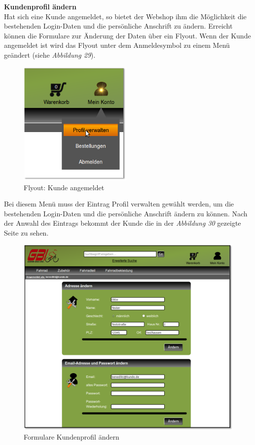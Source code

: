 \textbf{Kundenprofil ändern}\\
Hat sich eine Kunde angemeldet, so bietet der Webshop ihm die Möglichkeit die bestehenden Login-Daten und die persönliche Anschrift zu ändern. Erreicht können die Formulare zur Änderung der Daten über ein Flyout. Wenn der Kunde angemeldet ist wird das Flyout unter dem Anmeldesymbol zu einem Menü geändert (siehe \textit{Abbildung 29}).
\begin{figure}[H]
	\begin{center}
			\includegraphics[width=55mm]{Bilder/Abbildung15_Menue_Profil_aendern.png}
	\end{center}
	\caption{Flyout: Kunde angemeldet}
\end{figure}
Bei diesem Menü muss der Eintrag \glqq Profil verwalten\grqq{} gewählt werden, um die bestehenden Login-Daten und die persönliche Anschrift ändern zu können. Nach der Anwahl des Eintrags bekommt der Kunde die in der \textit{Abbildung 30} gezeigte Seite zu sehen.
\begin{figure}[H]
	\begin{center}
			\includegraphics[width=130mm]{Bilder/formulare_profil_aendern.png}
	\end{center}
	\caption{Formulare Kundenprofil ändern}
\end{figure}
